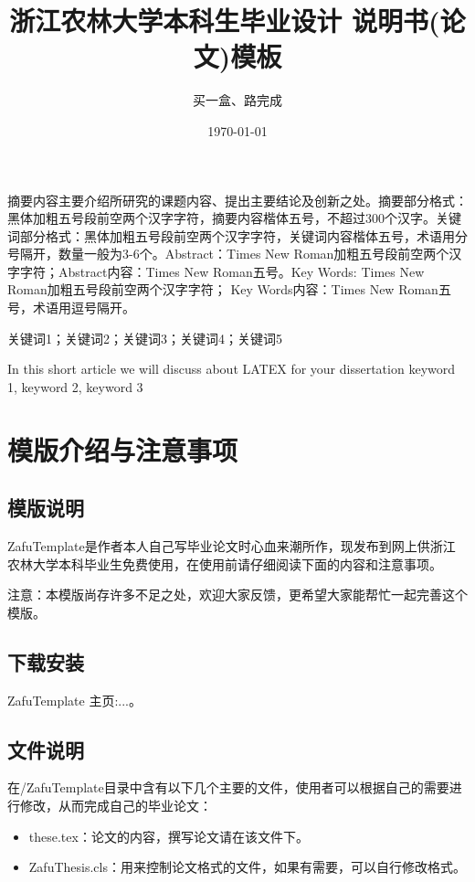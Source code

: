 \documentclass[AutoFakeBold]{ZafuThesis}
\author{买一盒、路完成}%
\date{\today}%
\title{{浙江农林大学本科生毕业设计 }{说明书(论文)模板}}%
\begin{document}
\customCover

\makestatement

\customContent

\frontmatter
\ZhAbstract
{
  摘要内容主要介绍所研究的课题内容、提出主要结论及创新之处。摘要部分格式：黑体加粗五号段前空两个汉字字符，摘要内容楷体五号，不超过300个汉字。关键词部分格式：黑体加粗五号段前空两个汉字字符，关键词内容楷体五号，术语用分号隔开，数量一般为3-6个。Abstract：Times New Roman加粗五号段前空两个汉字字符；Abstract内容：Times New Roman五号。Key Words: Times New Roman加粗五号段前空两个汉字字符； Key Words内容：Times New Roman五号，术语用逗号隔开。
  
}
{关键词1；关键词2；关键词3；关键词4；关键词5}


\EnAbstract
{In this short article we will discuss about LATEX for your dissertation}
{keyword 1, keyword 2, keyword 3}



\mainmatter
\section{模版介绍与注意事项}
\subsection{模版说明}
ZafuTemplate是作者本人自己写毕业论文时心血来潮所作，现发布到网上供浙江农林大学本科毕业生免费使用，在使用前请仔细阅读下面的内容和注意事项。\par
注意：本模版尚存许多不足之处，欢迎大家反馈，更希望大家能帮忙一起完善这个模版。
\subsection{下载安装}
ZafuTemplate 主页:...。
\subsection{文件说明}
在/ZafuTemplate目录中含有以下几个主要的文件，使用者可以根据自己的需要进行修改，从而完成自己的毕业论文：
\begin{itemize}
  \item these.tex：论文的内容，撰写论文请在该文件下。
  \item ZafuThesis.cls：用来控制论文格式的文件，如果有需要，可以自行修改格式。
\end{itemize}
\end{document}
